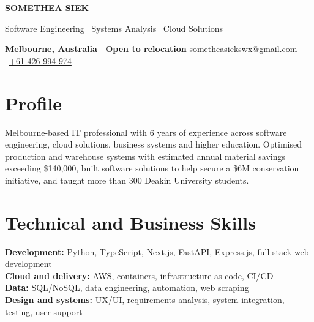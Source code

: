 \documentclass[11pt,a4paper]{article}
\begin{document}
{\fontsize{27}{29}\selectfont\bfseries\color{navy} SOMETHEA SIEK}\par
\vspace{5pt}
{\large Software Engineering \textbar\ Systems Analysis \textbar\ Cloud Solutions}\par
\vspace{5pt}
{\small \textbf{Melbourne, Australia \textbar\ Open to relocation} \hfill \href{mailto:sometheasiekswx@gmail.com}{sometheasiekswx@gmail.com} \textbar\ \href{tel:+61426994974}{+61 426 994 974}}\par

\section{Profile}
Melbourne-based IT professional with 6 years of experience across software engineering, cloud solutions, business systems and higher education. Optimised production and warehouse systems with estimated annual material savings exceeding \$140,000, built software solutions to help secure a \$6M conservation initiative, and taught more than 300 Deakin University students.

\section{Technical and Business Skills}
\textbf{Development:} Python, TypeScript, Next.js, FastAPI, Express.js, full-stack web development\\
\textbf{Cloud and delivery:} AWS, containers, infrastructure as code, CI/CD\\
\textbf{Data:} SQL/NoSQL, data engineering, automation, web scraping\\
\textbf{Design and systems:} UX/UI, requirements analysis, system integration, testing, user support
\end{document}
